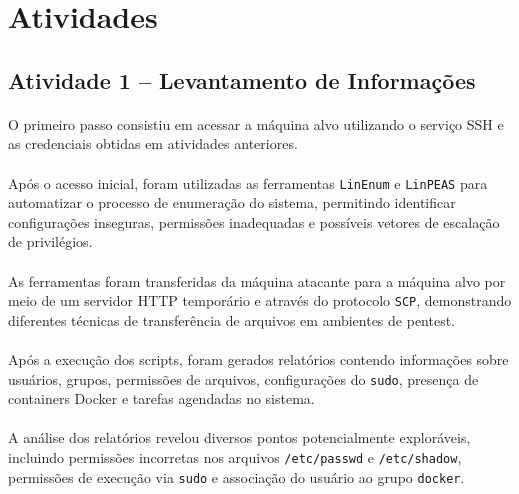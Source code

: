\section{Atividades}

\subsection{Atividade 1 -- Levantamento de Informações}

\paragraph{}
O primeiro passo consistiu em acessar a máquina alvo utilizando o serviço SSH e
as credenciais obtidas em atividades anteriores.

\paragraph{}
Após o acesso inicial, foram utilizadas as ferramentas \texttt{LinEnum} e
\texttt{LinPEAS} para automatizar o processo de enumeração do sistema,
permitindo identificar configurações inseguras, permissões inadequadas e
possíveis vetores de escalação de privilégios.

\paragraph{}
As ferramentas foram transferidas da máquina atacante para a máquina alvo por
meio de um servidor HTTP temporário e através do protocolo \texttt{SCP},
demonstrando diferentes técnicas de transferência de arquivos em ambientes de
pentest.

\paragraph{}
Após a execução dos scripts, foram gerados relatórios contendo informações sobre
usuários, grupos, permissões de arquivos, configurações do \texttt{sudo},
presença de containers Docker e tarefas agendadas no sistema.

\paragraph{}
A análise dos relatórios revelou diversos pontos potencialmente exploráveis,
incluindo permissões incorretas nos arquivos \texttt{/etc/passwd} e
\texttt{/etc/shadow}, permissões de execução via \texttt{sudo} e associação do
usuário ao grupo \texttt{docker}.


